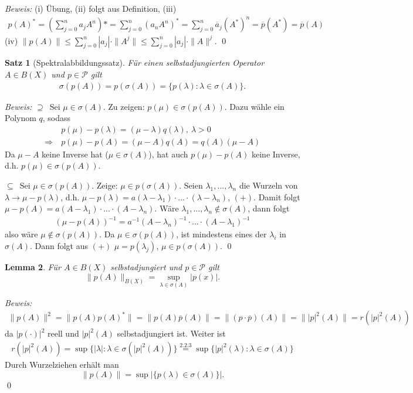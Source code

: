 \documentclass[12pt]{extreport} %
\newtheorem{Satz}{Satz}[subsection]
\newtheorem{Lemma}[Satz]{Lemma}
\numberwithin{equation}{section}
\newcommand{\m}{\cdot}
\newcommand{\Bew}{\emph{Beweis: }}
\begin{document}
	\Bew (i) Übung, (ii) folgt aus Definition, (iii) 
	\begin{align*}
		p(A)^* = (\sum_{j = 0}^{n}a_j A^n)* = \sum_{j = 0}^{n} (a_n A^n)^* = \sum_{j = 0}^{n} \overline{a}_j (A^*)^n = \overline{p}(A^*) = \overline{p}(A)
	\end{align*}
	(iv) $\|p(A)\| \leq\sum_{j = 0}^{n}|a_j|\m\|A^j\|\leq \sum_{j = 0}^{n}|a_j|\m\|A\|^j$.
	\qed
	
	\begin{Satz}[Spektralabbildungssatz]
		Für einen selbstadjungierten Operator $A\in B(X)$ und $p\in \mathcal{P}$ gilt 
		\begin{align*}
			\sigma(p(A)) = p(\sigma(A)) = \{p(\lambda):\lambda\in \sigma(A) \}.
		\end{align*}
	\end{Satz}
	
	\Bew \glqq$\supseteq$\grqq\ Sei $\mu\in \sigma(A)$. Zu zeigen: $p(\mu)\in \sigma(p(A))$. Dazu wähle ein Polynom $q$, sodass 
	\begin{align*}
		&~ p(\mu) - p(\lambda) = (\mu-\lambda)q(\lambda), ~\lambda>0\\
		\Rightarrow & ~p(\mu)-p(A) = (\mu-A)q(A) = q(A)(\mu-A)
	\end{align*}
	Da $\mu-A$ keine Inverse hat ($\mu\in \sigma(A)$), hat auch $p(\mu)-p(A)$ keine Inverse, d.h. $p(\mu)\in \sigma(p(A))$.
	
	\glqq$\subseteq$\grqq\ Sei $\mu\in \sigma(p(A))$. Zeige: $\mu\in p(\sigma(A))$. Seien $\lambda_1,...,\lambda_n$ die Wurzeln von $\lambda\rightarrow \mu-p(\lambda)$, d.h. $\mu-p(\lambda) = a(\lambda-\lambda_1)\m...\m (\lambda-\lambda_n)$, $(+)$. Damit folgt $\mu-p(A) = a(A-\lambda_1)\m...\m (A-\lambda_n)$. Wäre $\lambda_1,...,\lambda_n\notin \sigma(A)$, dann folgt 
	\begin{align*}
		(\mu-p(A))^{-1} = a^{-1}(A-\lambda_n)^{-1}\m...\m (A-\lambda_1)^{-1}
	\end{align*}
	also wäre $\mu\notin \sigma(p(A))$. Da $\mu \in \sigma(p(A))$, ist mindestens eines der $\lambda_i$ in $\sigma(A)$. Dann folgt aus $(+)$ $\mu=p(\lambda_j)$, $\mu \in p(\sigma(A))$.
	\qed
	
	
	\begin{Lemma}
		Für $A\in B(X)$ selbstadjungiert und $p\in \mathcal{P}$ gilt 
		$$\|p(A)\|_{B(X)} = \sup_{\lambda\in \sigma(A)}|p(x)|.$$	
	\end{Lemma}
	
	\Bew 
	\begin{align*}
		\|p(A)\|^2 = \|p(A)p(A)^*\| = \|p(A)\overline{p}(A)\| = \| (p\m \overline{p})(A)\| = \||p|^2(A)\| = r(|p|^2(A))
	\end{align*}
	da $|p(\m)|^2$ reell und $|p|^2(A)$ selbstadjungiert ist. Weiter ist
	\begin{align*}
		r(|p|^2(A)) = \sup\{|\lambda| : \lambda\in \sigma(|p|^2(A)) \} \overset{\text{2.2.3}}{=} \sup\{|p|^2(\lambda): \lambda\in \sigma(A) \}
	\end{align*}
	Durch Wurzelziehen erhält man 
	$$\|p(A)\| = \sup|\{p(\lambda)\in \sigma(A) \}|.$$
	\qed
	
\end{document}
